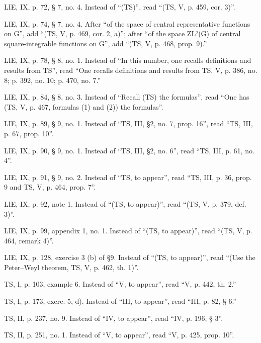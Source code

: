 LIE, IX, p. 72, § 7, no. 4. Instead of “(TS)”, read “(TS, V, p. 459, cor. 3)”.

LIE, IX, p. 74, § 7, no. 4. After “of the space of central representative functions on G”, add “(TS, V, p. 469, cor. 2, a)”; after “of the space ZL²(G) of central square-integrable functions on G”, add “(TS, V, p. 468, prop. 9).”

LIE, IX, p. 78, § 8, no. 1. Instead of “In this number, one recalls definitions and results from TS”, read “One recalls definitions and results from TS, V, p. 386, no. 8; p. 392, no. 10; p. 470, no. 7.”

LIE, IX, p. 84, § 8, no. 3. Instead of “Recall (TS) the formulas”, read “One has (TS, V, p. 467, formulas (1) and (2)) the formulas”.

LIE, IX, p. 89, § 9, no. 1. Instead of “TS, III, §2, no. 7, prop. 16”, read “TS, III, p. 67, prop. 10”.

LIE, IX, p. 90, § 9, no. 1. Instead of “TS, III, §2, no. 6”, read “TS, III, p. 61, no. 4”.

LIE, IX, p. 91, § 9, no. 2. Instead of “TS, to appear”, read “TS, III, p. 36, prop. 9 and TS, V, p. 464, prop. 7”.

LIE, IX, p. 92, note 1. Instead of “(TS, to appear)”, read “(TS, V, p. 379, def. 3)”.

LIE, IX, p. 99, appendix 1, no. 1. Instead of “(TS, to appear)”, read “(TS, V, p. 464, remark 4)”.

LIE, IX, p. 128, exercise 3 (b) of §9. Instead of “(TS, to appear)”, read “(Use the Peter--Weyl theorem, TS, V, p. 462, th. 1)”.

TS, I, p. 103, example 6. Instead of “V, to appear”, read “V, p. 442, th. 2.”

TS, I, p. 173, exerc. 5, d). Instead of “III, to appear”, read “III, p. 82, § 6.”

TS, II, p. 237, no. 9. Instead of “IV, to appear”, read “IV, p. 196, § 3”.

TS, II, p. 251, no. 1. Instead of “V, to appear”, read “V, p. 425, prop. 10”.

